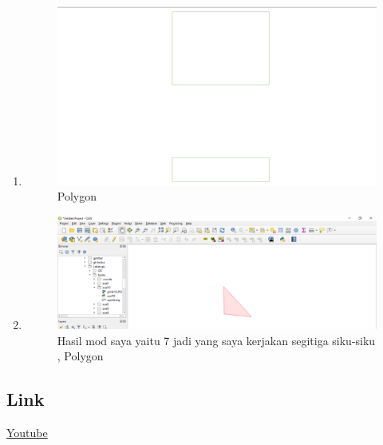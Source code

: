 \begin{enumerate}
	\item 
	
	\begin{figure}[H]
		\includegraphics[width=12cm]{figures/1174031/2/hasil9.PNG}
		\centering
		\caption{Polygon}
	\end{figure}
	
	\item 
	
	\begin{figure}[H]
		\includegraphics[width=12cm]{figures/1174031/2/hasil10.PNG}
		\centering
		\caption{Hasil mod saya yaitu 7 jadi yang saya kerjakan segitiga siku-siku , Polygon}
	\end{figure}	
\end{enumerate}

\subsection{Link}
\href{https://youtu.be/URVWarQ8wtY}{Youtube}